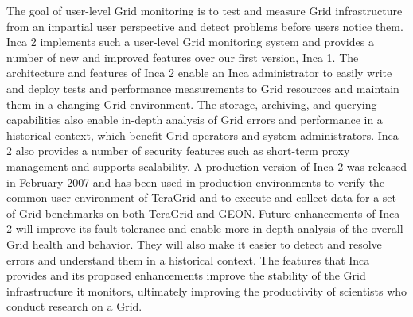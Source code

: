 \documentclass[times,10pt,twocolumn]{article}
\begin{document}
The goal of user-level Grid monitoring is to test and measure Grid
infrastructure from an impartial user perspective and detect problems before
users notice them.  Inca 2 implements such a user-level Grid monitoring system
and provides a number of new and improved features over our first version,
Inca 1.  The architecture and features of Inca 2 enable an Inca administrator
to easily write and deploy tests and performance measurements to Grid
resources and maintain them in a changing Grid environment.  The storage,
archiving, and querying capabilities also enable in-depth analysis of Grid
errors and performance in a historical context, which benefit Grid
operators and system administrators.  Inca 2 also provides a number of
security features such as short-term proxy management and supports
scalability.  A production version of Inca 2 was released in February 2007 and
has been used in production environments to verify the common user environment
of TeraGrid and to execute and collect data for a set of Grid benchmarks on
both TeraGrid and GEON.  Future enhancements of Inca 2 will improve its fault
tolerance and enable more in-depth analysis of the overall Grid health and
behavior.  They will also make it easier to detect and resolve errors
and understand them in a historical context.  The features that Inca
provides and its proposed enhancements improve the stability of the
Grid infrastructure it monitors, ultimately improving the productivity of
scientists who conduct research on a Grid. 




\end{document}
